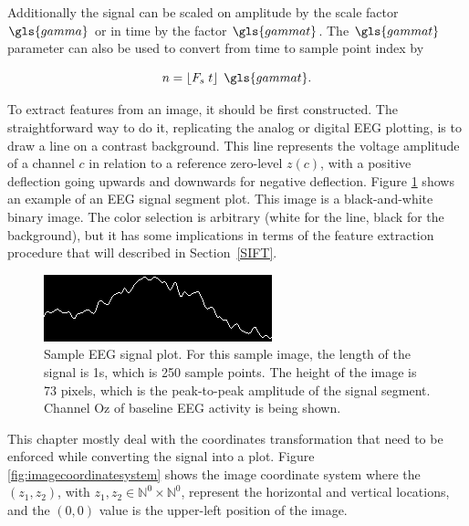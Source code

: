 Additionally the signal can be scaled on amplitude by the scale factor $\gls{gamma}$ or in time by the factor $\gls{gammat}$.  The  $\gls{gammat}$ parameter can also be used to convert from time to sample point index by

\begin{equation}
n = \left\lfloor F_s \; t \right\rfloor \; \gls{gammat}  .
\label{eq:samplepointconversion}
\end{equation}

\vspace{3pt}

To extract features from an image, it should be first constructed.  The straightforward way to do it, replicating the analog or digital EEG plotting, is to draw a line on a contrast background.  This line represents the voltage amplitude of a channel $c$ in relation to a reference zero-level $z(c)$, with a positive deflection going upwards and downwards for negative deflection.  Figure \ref{fig:plottingsample} shows an example of an EEG signal segment plot.  This image is a black-and-white binary image.  The color selection is arbitrary (white for the line, black for the background), but it has some implications in terms of the feature extraction procedure that will described in Section~\ref{SIFT}.

\begin{figure}[]
\centering
\includegraphics[scale=1.5]{images/plottingsample.png}
\caption[EEG Signal Mapping to Images]{Sample EEG signal plot.  For this sample image, the length of the signal is 1s, which is 250 sample points.  The height of the image is 73 pixels, which is the peak-to-peak amplitude of the signal segment.  Channel Oz of baseline EEG activity is being shown.}
\label{fig:plottingsample}
\end{figure}

This chapter mostly deal with the coordinates transformation that need to be enforced while converting the signal into a plot.  Figure \ref{fig:imagecoordinatesystem} shows the image coordinate system where the $(z_1,z_2)$, with  $z_1,z_2 \in \mathbb{N}^0 \times \mathbb{N}^0$, represent the horizontal and vertical locations, and the $(0,0)$ value is the upper-left position of the image. 

